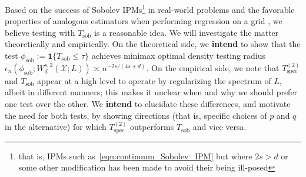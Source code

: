\documentclass{article}
\newcommand{\1}{\mathbf{1}}
\theoremstyle{alden}
\theoremstyle{aldenthm}
\theoremstyle{definition}
\theoremstyle{remark}
\begin{document}
Based on the success of Sobolev IPMs\footnote{that is, IPMs such as~\eqref{eqn:continuum_Sobolev_IPM} but where $2s > d$ or some other modification has been made to avoid their being ill-posed} in real-world problems \citet{mroueh17,arbel18} and the favorable properties of analogous estimators when performing regression on a grid \citet{sadhanala16}, we believe testing with $T_{\textrm{sob}}$ is a reasonable idea. We will investigate the matter theoretically and empirically. On the theoretical side, we \textbf{intend} to show that the test  $\phi_{\mathrm{sob}} := \1\{T_{\mathrm{sob}} \leq \tau\}$ achieves minimax optimal density testing radius $\epsilon_n(\phi_{\mathrm{sob}};W_d^{s,2}(\mathcal{X};L)) \asymp n^{-2s/(4s + d)}$. On the empirical side, we note that $T_{\mathrm{spec}}^{(2)}$ and $T_{\mathrm{sob}}$ appear at a high level to operate  by regularizing the spectrum of $L$, albeit in different manners; this makes it unclear when and why we should prefer one test over the other. We \textbf{intend} to elucidate these differences, and motivate the need for both tests, by showing directions (that is, specific choices of $p$ and $q$ in the alternative) for which $T_{\mathrm{spec}}^{(2)}$ outperforms $T_{\mathrm{sob}}$ and vice versa.
\end{document}
